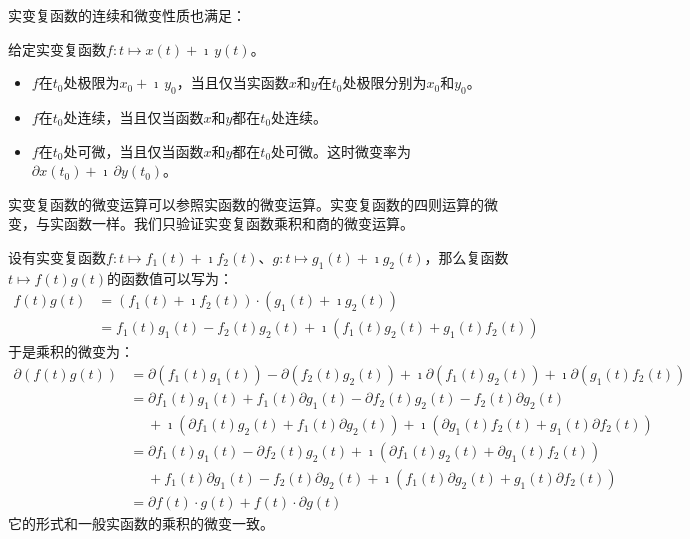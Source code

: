 \documentclass[12pt,UTF8]{ctexbook}
\begin{document}
实变复函数的连续和微变性质也满足：
\begin{tm}\label{tm:1-2-10}
    给定实变复函数$f: t\mapsto x(t) + \imath\, y(t)$。
    \begin{itemize}
        \item $f$在$t_0$处极限为$x_0 + \imath\, y_0$，当且仅当实函数$x$和$y$在$t_0$处极限分别为$x_0$和$y_0$。
        \item $f$在$t_0$处连续，当且仅当函数$x$和$y$都在$t_0$处连续。
        \item $f$在$t_0$处可微，当且仅当函数$x$和$y$都在$t_0$处可微。这时微变率为$\partial x(t_0)+ \imath\,\partial y(t_0)$。
    \end{itemize}
\end{tm}

实变复函数的微变运算可以参照实函数的微变运算。实变复函数的四则运算的微变，与实函数一样。我们只验证实变复函数乘积和商的微变运算。

设有实变复函数$f: t\mapsto f_1(t) + \imath f_2 (t)$、$g: t\mapsto g_1(t) + \imath g_2 (t)$，那么复函数$t\mapsto f(t) g(t)$的函数值可以写为：
\begin{align*}
    f(t) g(t) &= (f_1(t) + \imath f_2 (t))\cdot (g_1(t) + \imath g_2 (t)) \\
    &= f_1(t)g_1(t) - f_2 (t)g_2 (t) + \imath (f_1 (t) g_2 (t) + g_1(t) f_2 (t))
\end{align*}
于是乘积的微变为：
\begin{align*}
    \partial (f(t) g(t)) &= \partial (f_1(t)g_1(t)) - \partial (f_2 (t)g_2 (t)) + \imath \partial (f_1 (t) g_2 (t) ) + \imath \partial (g_1(t) f_2 (t)) \\
    &= \partial f_1(t)g_1(t) + f_1(t) \partial g_1(t) - \partial f_2 (t)g_2 (t) - f_2 (t) \partial g_2 (t) \\ 
    &\;\quad + \imath ( \partial f_1 (t) g_2 (t) + f_1 (t) \partial g_2 (t)) +   \imath (\partial g_1(t) f_2 (t) + g_1(t) \partial f_2 (t)) \\
    &= \partial f_1(t)g_1(t) - \partial f_2 (t)g_2 (t) + \imath ( \partial f_1 (t) g_2 (t) + \partial g_1(t) f_2 (t)) \\
    &\;\quad + f_1(t) \partial g_1(t) - f_2 (t) \partial g_2 (t) + \imath (f_1 (t) \partial g_2 (t) + g_1(t) \partial f_2 (t)) \\
    &= \partial f(t) \cdot g(t) + f(t) \cdot \partial g(t)
\end{align*}
它的形式和一般实函数的乘积的微变一致。
\end{document}
